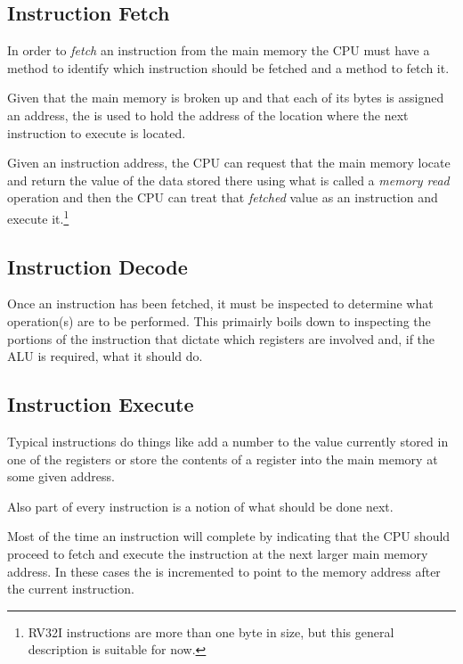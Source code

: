 \subsection{Instruction Fetch}

In order to {\em fetch} an instruction from the main memory the CPU
must have a method to identify which instruction should be fetched and
a method to fetch it. 

Given that the main memory is broken up and that each of its bytes is 
assigned an address, the  is used to hold the address of the
location where the next instruction to execute is located.

Given an instruction address, the CPU can request that the main memory 
locate and return the value of the data stored there using what is called 
a {\em memory read} operation and then the CPU can treat that {\em fetched}
value as an instruction and execute it.\footnote{RV32I instructions are 
more than one byte in size, but this general description is suitable for now.}


\subsection{Instruction Decode}

Once an instruction has been fetched, it must be inspected to determine what
operation(s) are to be performed.  This primairly boils down to inspecting
the portions of the instruction that dictate which registers are involved
and, if the ALU is required, what it should do.


\subsection{Instruction Execute}

Typical instructions do things like add a number to the value
currently stored in one of the registers or store the contents of a
register into the main memory at some given address.

Also part of every instruction is a notion of what should be done next.

Most of the time an instruction will complete by indicating that
the CPU should proceed to fetch and execute the instruction at the next
larger main memory address.  In these cases the  is incremented
to point to the memory address after the current instruction.


